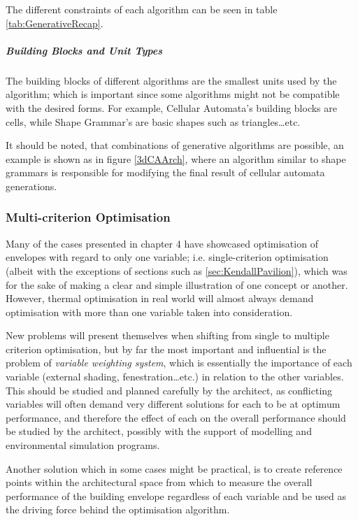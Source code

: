 The different constraints of each algorithm can be seen in table \ref{tab:GenerativeRecap}.

\subparagraph{Building Blocks and Unit Types}

The building blocks of different algorithms are the smallest units used by the algorithm; which is important since some algorithms might not be compatible with the desired forms. For example, Cellular Automata's building blocks are cells, while Shape Grammar's are basic shapes such as triangles\ldots{}etc.

It should be noted, that combinations of generative algorithms are possible, an example is shown as in figure \ref{3dCAArch}, where an algorithm similar to shape grammars is responsible for modifying the final result of cellular automata generations.

\subsubsection{Multi-criterion Optimisation}

Many of the cases presented in chapter 4 have showcased optimisation of envelopes with regard to only one variable; i.e. single-criterion optimisation (albeit with the exceptions of sections such as \ref{sec:KendallPavilion}), which was for the sake of making a clear and simple illustration of one concept or another. However, thermal optimisation in real world will almost always demand optimisation with more than one variable taken into consideration.

New problems will present themselves when shifting from single to multiple criterion optimisation, but by far the most important and influential is the problem of \emph{variable weighting system}, which is essentially the importance of each variable (external shading, fenestration\ldots etc.) in relation to the other variables. This should be studied and planned carefully by the architect, as conflicting variables will often demand very different solutions for each to be at optimum performance, and therefore the effect of each on the overall performance should be studied by the architect, possibly with the support of modelling and environmental simulation programs.

Another solution which in some cases might be practical, is to create reference points within the architectural space from which to measure the overall performance of the building envelope regardless of each variable and be used as the driving force behind the optimisation algorithm.


